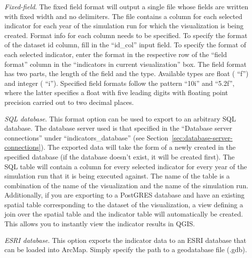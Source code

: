 \emph{Fixed-field}. The fixed field format will output a single file
whose fields are written with fixed width and no delimiters. The file
contains a column for each selected indicator for each year of the
simulation run for which the visualization is being created. Format
info for each column needs to be specified. To specify the format of
the dataset id column, fill in the ``id\_col'' input field. To
specify the format of each selected indicator, enter the format in the
respective row of the ``field format'' column in the  ``indicators in
current visualization'' box. The field format has two parts, the length
of the field and the type. Available types are float ( ``f'') and
integer ( ``i''). Specified field formats follow the pattern  ``10i'' and
 ``5.2f'', where the latter specifies a float with five leading digits
with floating point precision carried out to two decimal places.

\emph{SQL database}. This format option can be used to export to an
arbitrary SQL database. The database server used is that specified in
the ``Database server connections'' under  ``indicators\_database''
(see Section~\ref{sec:database-server-connections}). The exported data
will take the form of a newly created in the specified database (if the database doesn't exist, it will be created
first). The SQL table will contain a column for every selected
indicator for every year of the simulation run that it is being
executed against. The name of the table is a combination of the name of
the visualization and the name of the simulation run. Additionally,
if you are exporting to a PostGRES database and have an existing
spatial table corresponding to the dataset of the visualization, a view
defining a join over the spatial table and the indicator table will
automatically be created. This allows you to instantly view the
indicator results in QGIS. 

\emph{ESRI database}. This option exports the
indicator data to an ESRI database that can be loaded into ArcMap.
Simply specify the path to a geodatabase file (.gdb).


